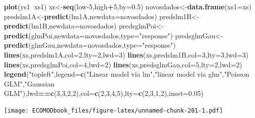 \documentclass[
]{book}
\newenvironment{Shaded}{\begin{snugshade}}{\end{snugshade}}
\newcommand{\DataTypeTok}[1]{\textcolor[rgb]{0.13,0.29,0.53}{#1}}
\newcommand{\DecValTok}[1]{\textcolor[rgb]{0.00,0.00,0.81}{#1}}
\newcommand{\FloatTok}[1]{\textcolor[rgb]{0.00,0.00,0.81}{#1}}
\newcommand{\KeywordTok}[1]{\textcolor[rgb]{0.13,0.29,0.53}{\textbf{#1}}}
\newcommand{\NormalTok}[1]{#1}
\newcommand{\OperatorTok}[1]{\textcolor[rgb]{0.81,0.36,0.00}{\textbf{#1}}}
\newcommand{\StringTok}[1]{\textcolor[rgb]{0.31,0.60,0.02}{#1}}
\begin{document}
\begin{Shaded}
\begin{Highlighting}[]
\KeywordTok{plot}\NormalTok{(ys1}\OperatorTok{~}\NormalTok{xs1)}
\NormalTok{xs<-}\KeywordTok{seq}\NormalTok{(low}\DecValTok{-5}\NormalTok{,high}\OperatorTok{+}\DecValTok{5}\NormalTok{,}\DataTypeTok{by=}\FloatTok{0.5}\NormalTok{)}
\NormalTok{novosdados<-}\KeywordTok{data.frame}\NormalTok{(}\DataTypeTok{xs1=}\NormalTok{xs)}
\NormalTok{predslm1A<-}\KeywordTok{predict}\NormalTok{(lm1A,}\DataTypeTok{newdata=}\NormalTok{novosdados)}
\NormalTok{predslm1B<-}\KeywordTok{predict}\NormalTok{(lm1B,}\DataTypeTok{newdata=}\NormalTok{novosdados)}
\NormalTok{predsglmPoi<-}\KeywordTok{predict}\NormalTok{(glmPoi,}\DataTypeTok{newdata=}\NormalTok{novosdados,}\DataTypeTok{type=}\StringTok{"response"}\NormalTok{)}
\NormalTok{predsglmGau<-}\KeywordTok{predict}\NormalTok{(glmGau,}\DataTypeTok{newdata=}\NormalTok{novosdados,}\DataTypeTok{type=}\StringTok{"response"}\NormalTok{)}
\KeywordTok{lines}\NormalTok{(xs,predslm1A,}\DataTypeTok{col=}\DecValTok{2}\NormalTok{,}\DataTypeTok{lty=}\DecValTok{2}\NormalTok{,}\DataTypeTok{lwd=}\DecValTok{3}\NormalTok{)}
\KeywordTok{lines}\NormalTok{(xs,predslm1B,}\DataTypeTok{col=}\DecValTok{3}\NormalTok{,}\DataTypeTok{lty=}\DecValTok{3}\NormalTok{,}\DataTypeTok{lwd=}\DecValTok{3}\NormalTok{)}
\KeywordTok{lines}\NormalTok{(xs,predsglmPoi,}\DataTypeTok{col=}\DecValTok{4}\NormalTok{,}\DataTypeTok{lwd=}\DecValTok{2}\NormalTok{)}
\KeywordTok{lines}\NormalTok{(xs,predsglmGau,}\DataTypeTok{col=}\DecValTok{5}\NormalTok{,}\DataTypeTok{lty=}\DecValTok{2}\NormalTok{,}\DataTypeTok{lwd=}\DecValTok{2}\NormalTok{)}
\KeywordTok{legend}\NormalTok{(}\StringTok{"topleft"}\NormalTok{,}\DataTypeTok{legend=}\KeywordTok{c}\NormalTok{(}\StringTok{"Linear model via lm"}\NormalTok{,}\StringTok{"linear model via glm"}\NormalTok{,}\StringTok{"Poisson GLM"}\NormalTok{,}\StringTok{"Gaussian GLM"}\NormalTok{),lwd}\OperatorTok{==}\KeywordTok{c}\NormalTok{(}\DecValTok{3}\NormalTok{,}\DecValTok{3}\NormalTok{,}\DecValTok{2}\NormalTok{,}\DecValTok{2}\NormalTok{),}\DataTypeTok{col=}\KeywordTok{c}\NormalTok{(}\DecValTok{2}\NormalTok{,}\DecValTok{3}\NormalTok{,}\DecValTok{4}\NormalTok{,}\DecValTok{5}\NormalTok{),}\DataTypeTok{lty=}\KeywordTok{c}\NormalTok{(}\DecValTok{2}\NormalTok{,}\DecValTok{3}\NormalTok{,}\DecValTok{1}\NormalTok{,}\DecValTok{2}\NormalTok{),}\DataTypeTok{inset=}\FloatTok{0.05}\NormalTok{)}
\end{Highlighting}
\end{Shaded}

\texttt{[image: ECOMODbook\_files/figure-latex/unnamed-chunk-201-1.pdf]}
\end{document}
